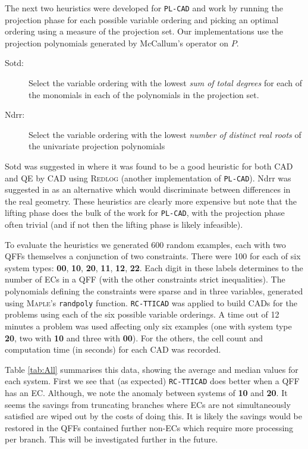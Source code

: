 \documentclass[runningheads,a4paper]{llncs}
\begin{document}
The next two heuristics were developed for \texttt{PL-CAD} and work by running the projection phase for each possible variable ordering and picking an optimal ordering using a measure of the projection set.
Our implementations use the projection polynomials generated by McCallum's operator \cite{McCallum1998} on $P$.
\begin{description}
\item[Sotd:] Select the variable ordering with the lowest \emph{sum of total degrees} for each of the monomials in each of the polynomials in the projection set.
\item[Ndrr:] Select the variable ordering with the lowest \emph{number of distinct real roots} of the univariate projection polynomials
\end{description}  
Sotd was suggested in \cite{DSS04} where it was found to be a good heuristic for both CAD and QE by CAD using \textsc{Redlog} (another implementation of \texttt{PL-CAD}).  Ndrr was suggested in \cite{BDEW13} as an alternative which would discriminate between differences in the real geometry. These heuristics are clearly more expensive but note that the lifting phase does the bulk of the work for \texttt{PL-CAD}, with the projection phase often trivial (and if not then the lifting phase is likely infeasible).  



To evaluate the heuristics we generated 600 random examples, each with two QFFs themselves a conjunction of two constraints.  
There were 100 for each of six system types: \textbf{00}, \textbf{10}, \textbf{20}, \textbf{11}, \textbf{12}, \textbf{22}.  Each digit in these labels determines to the number of ECs in a QFF (with the other constraints strict inequalities).  The polynomials defining the constraints were sparse and in three variables, generated using \textsc{Maple}'s \texttt{randpoly} function.  
\texttt{RC-TTICAD} was applied to build CADs for the problems using each of the six possible variable orderings. 
A time out of 12 minutes a problem was used affecting only six examples (one with system type \textbf{20}, two with \textbf{10} and three with \textbf{00}).  For the others, the cell count and computation time (in seconds) for each CAD was recorded.  

Table \ref{tab:All} summarises this data, showing the average and median values for each system.  First we see that (as expected) \texttt{RC-TTICAD} does better when a QFF has an EC.
Although, we note the anomaly between systems of \textbf{10} and \textbf{20}.  It seems the savings from truncating branches where ECs are not simultaneously satisfied are wiped out by the costs of doing this.  It is likely the savings would be restored in the QFFs contained further non-ECs which require more processing per branch.  This will be investigated further in the future.
\end{document}
